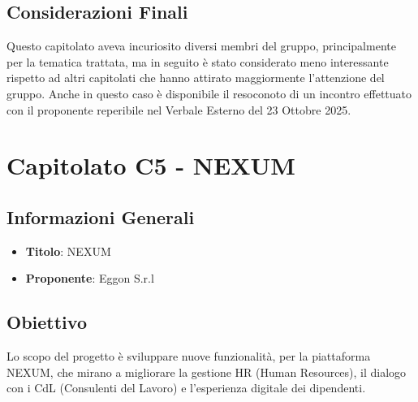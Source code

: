 \documentclass[a4paper,12pt]{article}
\begin{document}
    \subsection{Considerazioni Finali}
    Questo capitolato aveva incuriosito diversi membri del gruppo, principalmente per la tematica trattata, ma in seguito è stato considerato meno interessante rispetto ad altri capitolati che hanno attirato maggiormente l’attenzione del gruppo. Anche in questo caso è disponibile il resoconoto di un incontro effettuato con il proponente reperibile nel Verbale Esterno del 23 Ottobre 2025.

    \section{Capitolato C5 - NEXUM}
    \subsection{Informazioni Generali}
        \begin{itemize}
            \item \textbf{Titolo}: NEXUM
            \item \textbf{Proponente}: Eggon S.r.l
        \end{itemize}
    \subsection{Obiettivo}
    Lo scopo del progetto è sviluppare nuove funzionalità, per la piattaforma NEXUM, che mirano a migliorare la gestione HR (Human Resources), il dialogo con i CdL (Consulenti del Lavoro) e l’esperienza digitale dei dipendenti.
\end{document}
